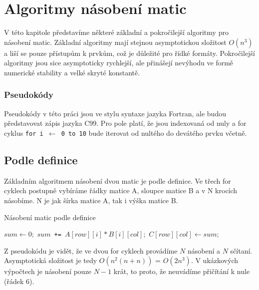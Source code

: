 \chapter{Algoritmy násobení matic}

V této kapitole představíme některé základní a pokročilejší algoritmy pro násobení matic. Základní algoritmy mají stejnou asymptotickou složitost $O(n^3)$ a liší se pouze přístupům k prvkům, což je důležité pro řídké formáty. Pokročilejší algoritmy jsou sice asymptoticky rychlejší, ale přinášejí nevýhodu ve formě numerické stability a velké skryté konstantě.

\subsection{Pseudokódy}

Pseudokódy v této práci jsou ve stylu syntaxe jazyka Fortran, ale budou představovat zápis jazyka C99. Pro pole platí, že jsou indexovaná od nuly a for cyklus \texttt{for i $\gets$ 0 to 10} bude iterovat od nultého do devátého prvku včetně.

\section{Podle definice}

Základním algoritmem násobení dvou matic je podle definice. Ve třech for cyklech postupně  vybíráme řádky matice A, sloupce matice B a v N krocích násobíme. N je jak šírka matice A, tak i výška matice B.

\begin{algorithm}[H]
	\caption{Násobení matic podle definice}\label{mmm-by-definiton}
	\begin{algorithmic}[1]
		\State \texttt{$sum \gets 0;$}
			\State \texttt{$sum $ += $ A[row][i] * B[i][col];$}
		\EndFor
		\State \texttt{$C[row][col] \gets sum;$}
	\EndFor
\EndFor
		\EndProcedure
	\end{algorithmic}
\end{algorithm}

Z pseudokódu je vidět, že ve dvou for cyklech provádíme $N$ násobení a $N$ sčítaní. Asymptotická složitost je tedy $O(n^2(n + n))$ = $O(2n^3)$. V ukázkových výpočtech je násobení pouze $N-1$ krát, to proto, že neuvádíme přičítání k nule (řádek 6).

